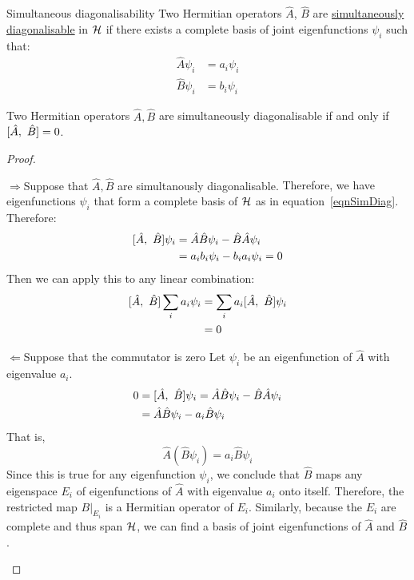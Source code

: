 \documentclass[../Main.tex]{subfiles}
\begin{document}
\begin{definition}{Simultaneous diagonalisability}
    Two Hermitian operators $\hat{A}$, $\hat{B}$ are \underline{simultaneously diagonalisable} in $\mathcal{H}$ if there exists a complete basis of joint eigenfunctions $\psi_i$ such that:
    \begin{equation}
        \begin{aligned}
            \hat{A}\psi_i &= a_i \psi_i \\
            \hat{B}\psi_i &= b_i \psi_i
        \end{aligned}
        \label{eqnSimDiag}
    \end{equation}
\end{definition}
\begin{theorem}
    Two Hermitian operators $\hat{A}, \hat{B}$ are simultaneously diagonalisable if and only if $[\hat{A},~\hat{B}] = 0$.
    \label{thmSimDiagIffCmmtZero}
\end{theorem}
\begin{proof}
    \begin{proofdirection}{$\Rightarrow$}{Suppose that $\hat{A}, \hat{B}$ are simultanously diagonalisable.}
        Therefore, we have eigenfunctions $\psi_i$ that form a complete basis of $\mathcal{H}$ as in equation~\ref{eqnSimDiag}. Therefore:
        \begin{align*}
            [\hat{A},~\hat{B}]\psi_i &= \hat{A} \hat{B} \psi_i - \hat{B}\hat{A} \psi_i \\
            &= a_i b_i \psi_i - b_i a_i \psi_i = 0
        \end{align*}
        Then we can apply this to any linear combination:
        \begin{align*}
            [\hat{A},~\hat{B}] \sum_{i} a_i \psi_i &= \sum_i a_i [\hat{A},~\hat{B}] \psi_i \\
            &= 0
        \end{align*}
    \end{proofdirection}
    \begin{proofdirection}{$\Leftarrow$}{Suppose that the commutator is zero}
        Let $\psi_i$ be an eigenfunction of $\hat{A}$ with eigenvalue $a_i$.
        \begin{align*}
            0 &= [\hat{A},~\hat{B}]\psi_i = \hat{A} \hat{B} \psi_i - \hat{B} \hat{A} \psi_i \\
            &= \hat{A} \hat{B} \psi_i - a_i \hat{B} \psi_i
        \end{align*}
        That is,
        \begin{equation*}
            \hat{A}(\hat{B}\psi_i) = a_i \hat{B} \psi_i
        \end{equation*}
        Since this is true for any eigenfunction $\psi_i$, we conclude that $\hat{B}$ maps any eigenspace $E_i$ of eigenfunctions of $\hat{A}$ with eigenvalue $a_i$ onto itself. 
        Therefore, the restricted map $B|_{E_i}$ is a Hermitian operator of $E_i$. Similarly, because the $E_i$ are complete and thus span $\mathcal{H}$, we can find a basis of joint eigenfunctions of $\hat{A}$ and $\hat{B}$.
    \end{proofdirection}
\end{proof}
\end{document}
